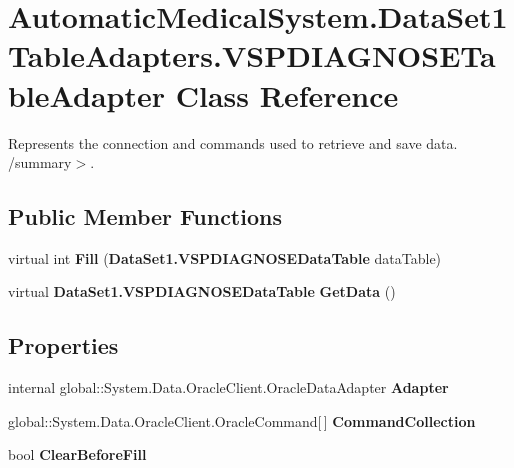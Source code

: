 \section{AutomaticMedicalSystem.DataSet1TableAdapters.VSPDIAGNOSETableAdapter Class Reference}
\label{class_automatic_medical_system_1_1_data_set1_table_adapters_1_1_v_s_p_d_i_a_g_n_o_s_e_table_adapter}
Represents the connection and commands used to retrieve and save data. /summary$>$.  


\subsection*{Public Member Functions}
\begin{CompactItemize}
\item 
virtual int \textbf{Fill} ({\bf DataSet1.VSPDIAGNOSEDataTable} dataTable)\label{class_automatic_medical_system_1_1_data_set1_table_adapters_1_1_v_s_p_d_i_a_g_n_o_s_e_table_adapter_91b845832752f529e05cb58fccf60abf}

\item 
virtual {\bf DataSet1.VSPDIAGNOSEDataTable} \textbf{GetData} ()\label{class_automatic_medical_system_1_1_data_set1_table_adapters_1_1_v_s_p_d_i_a_g_n_o_s_e_table_adapter_1d3aeee45fde8f55fb3ebca9ceb89b4c}

\end{CompactItemize}
\subsection*{Properties}
\begin{CompactItemize}
\item 
internal global::System.Data.OracleClient.OracleDataAdapter \textbf{Adapter}\hspace{0.3cm}{\tt  [get]}\label{class_automatic_medical_system_1_1_data_set1_table_adapters_1_1_v_s_p_d_i_a_g_n_o_s_e_table_adapter_0c20937326710be88d32abea3b31630f}

\item 
global::System.Data.OracleClient.OracleCommand[$\,$] \textbf{CommandCollection}\hspace{0.3cm}{\tt  [get]}\label{class_automatic_medical_system_1_1_data_set1_table_adapters_1_1_v_s_p_d_i_a_g_n_o_s_e_table_adapter_10c352107568597f2b8d7596392a06c8}

\item 
bool \textbf{ClearBeforeFill}\hspace{0.3cm}{\tt  [get, set]}\label{class_automatic_medical_system_1_1_data_set1_table_adapters_1_1_v_s_p_d_i_a_g_n_o_s_e_table_adapter_700dd46015f5efc92bb5470ad1a80709}

\end{CompactItemize}


